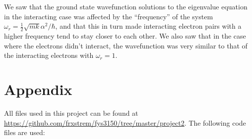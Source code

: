 \documentclass[11pt,a4paper]{article}
\begin{document}
We saw that the ground state wavefunction solutions to the eigenvalue equation in the interacting case was affected by the ``frequency'' of the system $\omega_r = \frac{1}{2} \sqrt{mk} \alpha^2 / \hbar$, and that this in turn made interacting electron pairs with a higher frequency tend to stay closer to each other. We also saw that in the case where the electrons didn't interact, the wavefunction was very similar to that of the interacting electrons with $\omega_r = 1$.

\clearpage
\appendix
\section{Appendix}

All files used in this project can be found at \url{https://github.com/frxstrem/fys3150/tree/master/project2}.
The following code files are used:
\end{document}
